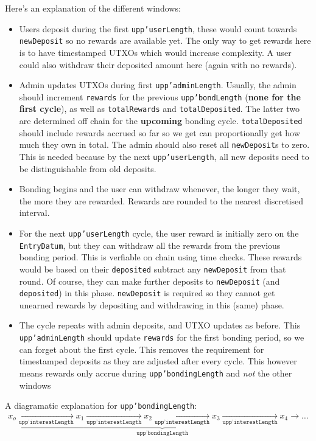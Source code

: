\documentclass[10pt, a4paper]{article}
\theoremstyle{definition}
\begin{document}
Here's an explanation of the different windows:
\begin{itemize}
\item{Users deposit during the first \texttt{upp'userLength}, these would count towards \texttt{newDeposit} so no rewards are available yet. The only way to get rewards here is to have timestamped UTXOs which would increase complexity. A user could also withdraw their deposited amount here (again with no rewards).}
\item{Admin updates UTXOs during first \texttt{upp'adminLength}. Usually, the admin should increment \texttt{rewards} for the previous \texttt{upp'bondLength} (\textbf{none for the first cycle}), as well as \texttt{totalRewards} and \texttt{totalDeposited}. The latter two are determined off chain for the \textbf{upcoming} bonding cycle. \texttt{totalDeposited} should include rewards accrued so far so we get can proportionally get how much they own in total. The admin should also reset all \texttt{newDeposit}s to zero. This is needed because by the next \texttt{upp'userLength}, all new deposits need to be distinguishable from old deposits.}
\item{Bonding begins and the user can withdraw whenever, the longer they wait, the more they are rewarded. Rewards are rounded to the nearest discretised interval.}
\item{For the next \texttt{upp'userLength} cycle, the user reward is initially zero on the \texttt{EntryDatum}, but they can withdraw all the rewards from the previous bonding period. This is verfiable on chain using time checks. These rewards would be based on their \texttt{deposited} subtract any \texttt{newDeposit} from that round. Of course, they can make further deposits to \texttt{newDeposit} (and \texttt{deposited}) in this phase. \texttt{newDeposit} is required so they cannot get unearned rewards by depositing and withdrawing in this (same) phase.}
\item{The cycle repeats with admin deposits, and UTXO updates as before. This \texttt{upp'adminLength} should update \texttt{rewards} for the first bonding period, so we can forget about the first cycle. This removes the requirement for timestamped deposits as they are adjusted after every cycle. This however means rewards only accrue during \texttt{upp'bondingLength} and \textit{not} the other windows}
\end{itemize}

A diagramatic explanation for \texttt{upp'bondingLength}:
\begin{equation}\label{eqn:bondingCycle}
x_o \underbrace{\xrightarrow[\texttt{upp'interestLength}] {} x_1  \xrightarrow[\texttt{upp'interestLength}] {} x_2 \xrightarrow[\texttt{upp'interestLength}] {} x_3 \xrightarrow[\texttt{upp'interestLength}] {} x_4  \rightarrow \ldots}_\texttt{upp'bondingLength}
\end{equation}
\end{document}
